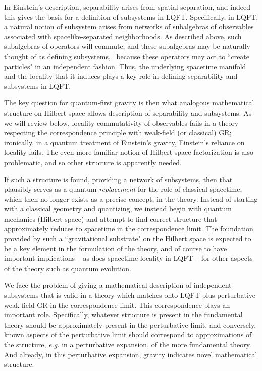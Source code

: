 In Einstein's description, separability arises from spatial separation, and indeed this gives the basis for a definition of subsystems in LQFT.  Specifically, in LQFT, a natural notion of subsystem arises from networks of subalgebras of observables associated with spacelike-separated neighborhoods.  As described above, such subalgebras of operators will commute, and these subalgebras may be naturally thought of as defining subsystems, \eg\ because these operators may  act to ``create particles" in an independent fashion.  Thus, the underlying spacetime manifold and the locality that it induces plays a key role in defining separability and subsystems in LQFT.  

The key question for quantum-first gravity is then what analogous mathematical structure on Hilbert space allows description of separability and subsystems.  As we will review below, locality commutativity of observables fails in a theory respecting the correspondence principle with weak-field (or classical) GR;   ironically, in a quantum treatment of Einstein's gravity, Einstein's reliance on locality fails.  
The even more familiar notion of Hilbert space factorization is also problematic, and so other structure is apparently needed.

If such a structure is found, providing a network of subsystems, then that plausibly serves as a quantum {\it replacement} for the role of classical spacetime, which then no longer exists as a precise concept, in the theory.  Instead of starting with a classical geometry and quantizing, we instead begin with quantum mechanics (Hilbert space) and attempt to find correct structure that approximately reduces to spacetime in the correspondence limit.
The foundation provided by such a ``gravitational substrate" on the Hilbert space is expected to be a key element in the formulation of the theory, and of course to have important implications -- as does spacetime locality in LQFT -- for other aspects of the theory such as quantum evolution.  
	



We face the problem of giving a mathematical description of independent subsystems that is valid in a theory which matches onto LQFT plus perturbative weak-field GR in the correspondence limit.  This correspondence plays an important role.  Specifically, whatever structure is present in the fundamental theory should be approximately present in the perturbative limit, and conversely, known aspects of the perturbative limit should correspond to approximations of the structure, {\it e.g.} in a perturbative expansion, of the more fundamental theory.  And already, in this perturbative expansion, gravity indicates novel mathematical structure.

